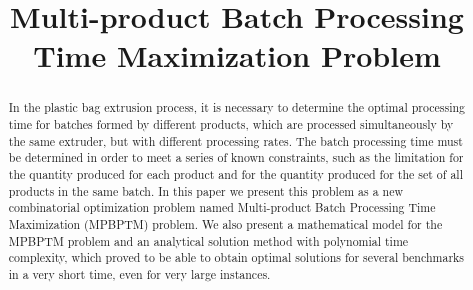 \documentclass[authoryear,preprint,12pt]{elsarticle}
\begin{document}
\begin{frontmatter}



\title{Multi-product Batch Processing Time Maximization Problem}





\begin{abstract}
In the plastic bag extrusion process, it is necessary to determine the optimal processing time for batches formed by different products, which are processed simultaneously by the same extruder, but with different processing rates. The batch processing time must be determined in order to meet a series of known constraints, such as the limitation for the quantity produced for each product and for the quantity produced for the set of all products in the same batch. In this paper we present this problem as a new combinatorial optimization problem named Multi-product Batch Processing Time Maximization (MPBPTM) problem. We also present a mathematical model for the MPBPTM problem and an analytical solution method with polynomial time complexity, which proved to be able to obtain optimal solutions for several benchmarks in a very short time, even for very large instances.
\end{abstract}


\end{frontmatter}
\end{document}
